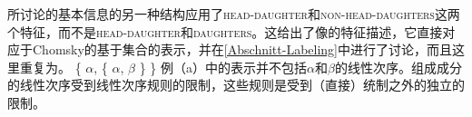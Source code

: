 \noindent
\citet[第9章]{ps2}所讨论的基本信息的另一种结构应用了\textsc{head-daughter}和\textsc{non-head-daughters}这两个特征，而不是\textsc{head-daughter}和\textsc{daughters}。这给出了像的特征描述，它直接对应于Chomsky的基于集合的表示，并在\ref{Abschnitt-Labeling}中进行了讨论，而且这里重复为。
\eal
\ex {}
\ex \{ $\alpha$, \{ $\alpha$, $\beta$ \} \}
\zl
例（a）中的表示并不包括$\alpha$和$\beta$的线性次序。组成成分的线性次序受到线性次序规则的限制，这些规则是受到（直接）统制之外的独立的限制。

